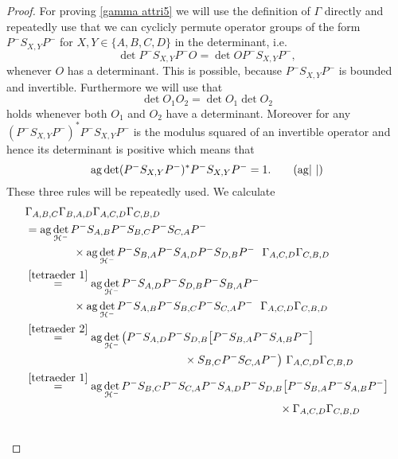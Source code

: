 \documentclass[b5paper,draft,openbib,12pt]{memoir}
\DeclareMathOperator{\ag}{ag}
\begin{document}
\begin{proof}
For proving \eqref{gamma attri5} we will use the definition of \(\Gamma\) directly and repeatedly use that we can cyclicly permute operator groups of the form
\(P^- S_{X,Y}P^-\) for \(X,Y\in \{A,B,C,D\}\) in the determinant, i.e.
\begin{equation}\label{tetraeder 1}
\det P^- S_{X,Y}P^- O = \det O P^- S_{X,Y}P^-,\tag{\(\circlearrowleft\)}
\end{equation}
whenever \(O\) has a determinant.
This is possible, because \(P^- S_{X,Y}P^-\) is bounded and invertible. Furthermore we will use that 
\begin{equation}\label{tetraeder 2}
\det O_1 O_2 = \det O_1 \det O_2\tag{\(\leftrightarrow\)}
\end{equation}
holds whenever 
both \(O_1\) and \(O_2\) have a determinant. Moreover for any  \((P^- S_{X,Y}P^-)^*P^- S_{X,Y}P^-\) is the modulus squared of an invertible operator and hence
its determinant is positive which means that 
\begin{equation}\label{tetraeder 3}
\ag \det (P^- S_{X,Y}P^-)^*P^- S_{X,Y}P^-=1.\tag{\(\ag\!|\,\, |\)}
\end{equation}
These three rules will be repeatedly used. We calculate
\begin{align}
&\Gamma_{A,B,C}\Gamma_{B,A,D}\Gamma_{A,C,D}\Gamma_{C,B,D}\\\notag
&=\ag \det_{\mathcal{H}^-}P^- S_{A,B}P^- S_{B,C}P^- S_{C,A}P^- \\
&\hspace{1,5cm}\times\ag \det_{\mathcal{H}^-}P^- S_{B,A}P^- S_{A,D}P^- S_{D,B}P^-~~ \Gamma_{A,C,D}\Gamma_{C,B,D}\\\notag
&\overset{\eqref{tetraeder 1}}{=}
\ag \det_{\mathcal{H}^-}P^-S_{A,D}P^- S_{D,B}P^- S_{B,A}P^- \\
&\hspace{1.5cm}\times \ag \det_{\mathcal{H}^-}P^- S_{A,B}P^- S_{B,C}P^- S_{C,A}P^- ~~  \Gamma_{A,C,D}\Gamma_{C,B,D}\\\notag
&\overset{\eqref{tetraeder 2}}{=}
\ag \det_{\mathcal{H}^-}\big(P^-S_{A,D}P^- S_{D,B} \big[P^- S_{B,A} P^- S_{A,B}P^-\big]\\
&\hspace{5cm}\times S_{B,C}P^- S_{C,A}P^-\big) ~ \Gamma_{A,C,D}\Gamma_{C,B,D}\\\notag
&\overset{\eqref{tetraeder 1}}{=}
\ag \det_{\mathcal{H}^-}P^-S_{B,C}P^- S_{C,A}P^-S_{A,D}P^- S_{D,B} \big[P^- S_{B,A} P^- S_{A,B}P^-\big]  \\
&\hspace{8cm}\times \Gamma_{A,C,D}\Gamma_{C,B,D}\\\notag

\end{align}
\end{proof}
\end{document}

